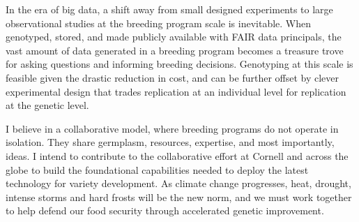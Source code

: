 \documentclass[11pt]{article}
\begin{document}
In the era of big data, a shift away from small designed experiments to large observational studies at the breeding program scale is inevitable. When genotyped, stored, and made publicly available with FAIR data principals, the vast amount of data generated in a breeding program becomes a treasure trove for asking questions and informing breeding decisions. Genotyping at this scale is feasible given the drastic reduction in cost, and can be further offset by clever experimental design that trades replication at an individual level for replication at the genetic level.

I believe in a collaborative model, where breeding programs do not operate in isolation. They share germplasm, resources, expertise, and most importantly, ideas. I intend to contribute to the collaborative effort at Cornell and across the globe to build the foundational capabilities needed to deploy the latest technology for variety development. As climate change progresses, heat, drought, intense storms and hard frosts will be the new norm, and we must work together to help defend our food security through accelerated genetic improvement. 




\end{document}
